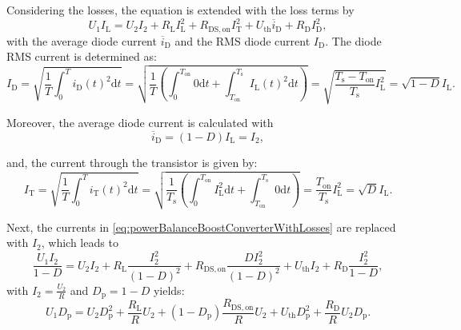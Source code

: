 \begin{solutionblock}
    Considering the losses, the equation is extended with the loss terms by
    \begin{equation}
        U_1 I_{\mathrm{L}} = U_2 I_2 + R_{\mathrm{L}} I_{\mathrm{L}}^2 + R_{\mathrm{DS,on}} I_{\mathrm{T}}^2 + U_{\mathrm{th}} \overline{i}_{\mathrm{D}} + R_{\mathrm{D}} I_{\mathrm{D}}^2,
        \label{eq:powerBalanceBoostConverterWithLosses}
    \end{equation}
    with the average diode current $\overline{i}_{\mathrm{D}}$ and the RMS diode current $I_{\mathrm{D}}$. The diode RMS current is determined as:
    \begin{equation}
        I_{\mathrm{D}} = \sqrt{\frac{1}{T} \int_{0}^{T} i_{\mathrm{D}}(t)^2 \mathrm{d}t}
        = \sqrt{\frac{1}{T} \left( \int_{0}^{T_{\mathrm{on}}} 0 \mathrm{d}t + \int_{T_{\mathrm{on}}}^{T_{\mathrm{s}}} I_{\mathrm{L}}(t)^2 \mathrm{d}t \right)}
        = \sqrt{\frac{{T_{\mathrm{s}}-T_{\mathrm{on}}}}{T_{\mathrm{s}}}I_{\mathrm{L}}^2}
        = \sqrt{1-D}I_{\mathrm{L}}.
    \end{equation}
    
    Moreover, the average diode current is calculated with
    \begin{equation}
        \overline{i}_{\mathrm{D}} = (1-D)I_{\mathrm{L}} = I_2,
        \label{eq:avgCurrentDiode}
    \end{equation}

    and, the current through the transistor is given by:
    \begin{equation}
        I_{\mathrm{T}} = \sqrt{\frac{1}{T} \int_{0}^{T} i_{\mathrm{T}}(t)^2 \mathrm{d}t}
        = \sqrt{\frac{1}{T_{\mathrm{s}}}\left(\int_{0}^{T_{\mathrm{on}}} I_{\mathrm{L}}^2 \mathrm{d} t + \int_{T_{\mathrm{on}}}^{T_{\mathrm{s}}} 0 \mathrm{d} t \right)}
        = \frac{T_{\mathrm{on}}}{T_{\mathrm{s}}}I_{\mathrm{L}}^2
        = \sqrt{D} I_{\mathrm{L}}.
    \end{equation}

    Next, the currents in \eqref{eq:powerBalanceBoostConverterWithLosses} are replaced with $I_{\mathrm{2}}$, which leads to
    \begin{equation}
        \frac{U_1 I_2}{1 -D} = U_2 I_2 + R_{\mathrm{L}}\frac{I_2^2}{\left(1-D\right)^2} + R_{\mathrm{DS,on}} \frac{D I_2^2}{\left(1-D\right)^2} + U_{\mathrm{th}}I_2 + R_{\mathrm{D}}\frac{I_2^2}{1-D},
    \end{equation}
    with $I_2 = \frac{U_2}{R}$ and $D_{\mathrm{p}} = 1-D$ yields:
    \begin{equation}
        U_1 D_{\mathrm{p}} = U_2 D_{\mathrm{p}}^2 + \frac{R_{\mathrm{L}}}{R} U_2 + (1-D_{\mathrm{p}}) \frac{R_{\mathrm{DS,on}}}{R}U_2 + U_{\mathrm{th}}D_{\mathrm{p}}^2 + \frac{R_{\mathrm{D}}}{R}U_2 D_{\mathrm{p}}.
    \end{equation}


\end{solutionblock}
